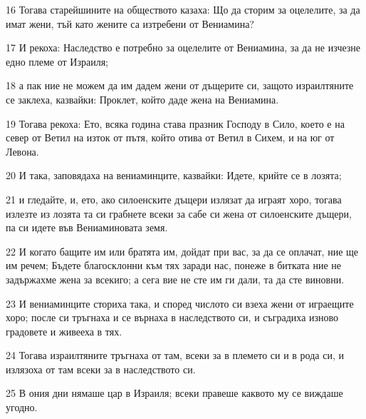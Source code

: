 \par 16 Тогава старейшините на обществото казаха: Що да сторим за оцелелите, за да имат жени, тъй като жените са изтребени от Вениамина?
\par 17 И рекоха: Наследство е потребно за оцелелите от Вениамина, за да не изчезне едно племе от Израиля;
\par 18 а пак ние не можем да им дадем жени от дъщерите си, защото израилтяните се заклеха, казвайки: Проклет, който даде жена на Вениамина.
\par 19 Тогава рекоха: Ето, всяка година става празник Господу в Сило, което е на север от Ветил на изток от пътя, който отива от Ветил в Сихем, и на юг от Левона.
\par 20 И така, заповядаха на вениаминците, казвайки: Идете, крийте се в лозята;
\par 21 и гледайте, и, ето, ако силоенските дъщери излязат да играят хоро, тогава излезте из лозята та си грабнете всеки за сабе си жена от силоенските дъщери, па си идете във Вениаминовата земя.
\par 22 И когато бащите им или братята им, дойдат при вас, за да се оплачат, ние ще им речем; Бъдете благосклонни към тях заради нас, понеже в битката ние не задържахме жена за всекиго; а сега вие не сте им ги дали, та да сте виновни.
\par 23 И вениаминците сториха така, и според числото си взеха жени от играещите хоро; после си тръгнаха и се върнаха в наследството си, и съградиха изново градовете и живееха в тях.
\par 24 Тогава израилтяните тръгнаха от там, всеки за в племето си и в рода си, и излязоха от там всеки за в наследството си.
\par 25 В ония дни нямаше цар в Израиля; всеки правеше каквото му се виждаше угодно.

